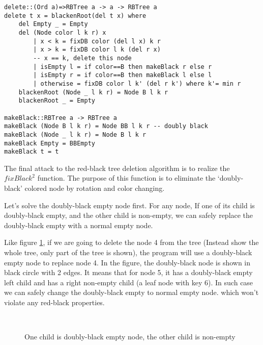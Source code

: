 \documentclass{article}
\begin{document}
\begin{lstlisting}
delete::(Ord a)=>RBTree a -> a -> RBTree a
delete t x = blackenRoot(del t x) where
    del Empty _ = Empty
    del (Node color l k r) x 
        | x < k = fixDB color (del l x) k r
        | x > k = fixDB color l k (del r x)
        -- x == k, delete this node
        | isEmpty l = if color==B then makeBlack r else r
        | isEmpty r = if color==B then makeBlack l else l
        | otherwise = fixDB color l k' (del r k') where k'= min r
    blackenRoot (Node _ l k r) = Node B l k r
    blackenRoot _ = Empty

makeBlack::RBTree a -> RBTree a
makeBlack (Node B l k r) = Node BB l k r -- doubly black
makeBlack (Node _ l k r) = Node B l k r
makeBlack Empty = BBEmpty
makeBlack t = t
\end{lstlisting}

The final attack to the red-black tree deletion algorithm is to
realize the $fixBlack^2$ function. The purpose of this function
is to eliminate the `doubly-black' colored node by rotation and
color changing.

Let's solve the doubly-black empty node first. For any node, 
If one of its child is doubly-black empty, and the other child is 
non-empty, we can safely replace the doubly-black empty with a 
normal empty node. 

Like figure \ref{fig:db-fix-1-nil}, if we
are going to delete the node 4 from the tree (Instead show the whole tree,
only part of the tree is shown), the program will use a doubly-black empty node
to replace node 4. In the figure, the doubly-black node is shown in black 
circle with 2 edges. It means that for node 5, it has a doubly-black empty 
left child and has a right non-empty child (a leaf node with key 6). In 
such case we can safely change the doubly-black empty to normal empty node. 
which won't violate any red-black properties.

\begin{figure}[htbp]
   \centering
    \\
   \caption{One child is doubly-black empty node, the other child is non-empty} \label{fig:db-fix-1-nil}
\end{figure}
\end{document}
